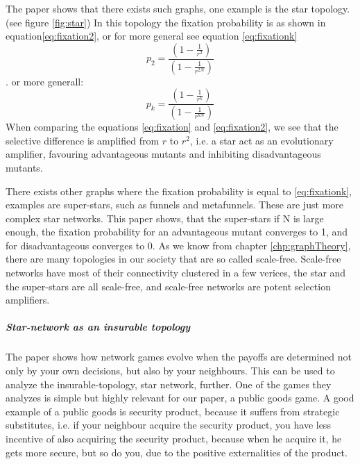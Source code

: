 The paper shows that there exists such graphs, one example is the star topology. (see figure \ref{fig:star})
In this topology the fixation probability is as shown in equation\ref{eq:fixation2}, or for more general see equation \ref{eq:fixationk} \begin{equation}p_{2}=\frac{(1-\frac{1}{r^{2}})}{(1-\frac{1}{r^{2N}})} \label{eq:fixation2} \end{equation}.
or more generall: \begin{equation}
p_{k}=\frac{(1-\frac{1}{r^{k}})}{(1-\frac{1}{r^{kN}})} \label{eq:fixationk}
\end{equation}
 When comparing the equations \ref{eq:fixation} and \ref{eq:fixation2}, we see that the selective difference is
 amplified from $r$ to $r^{2}$, i.e. a star act as an evolutionary amplifier, favouring advantageous
  mutants and inhibiting disadvantageous mutants.

There exists other graphs where the fixation probability is equal to \ref{eq:fixationk}, examples are super-stars, such as funnels and
metafunnels. These are just more complex star networks. This paper shows,  that the super-stars if N is large enough, the fixation probability for an advantageous mutant converges to 1, 
and for disadvantageous converges to 0. 
As we know from chapter \ref{chp:graphTheory}, there are many
topologies in our society that are so called scale-free. Scale-free networks have most of their connectivity clustered in a few verices, the star and the super-stars are all scale-free, and scale-free networks are potent selection amplifiers.

\subparagraph{Star-network as an insurable topology}
The paper \cite{networkgames} shows how network games evolve when the payoffs are determined not only by your own decisions, but also by your neighbours. This can be used to analyze the insurable-topology, star network, further. One of the games they analyzes is simple but highly relevant for our paper, a public goods game. A good example of a public goods is security product, because it suffers from strategic substitutes, i.e. if your neighbour acquire the security product, you have less incentive of also acquiring the security product, because when he acquire it, he gets more secure, but so do you, due to the positive externalities of the product.


